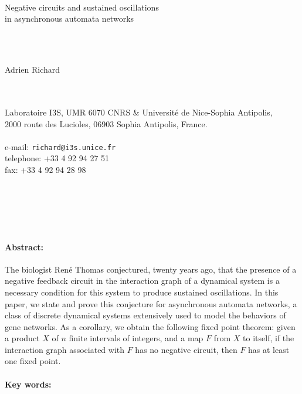 \documentclass[11pt]{article}
\begin{document}
~\\~\\~\\
\begin{center}
\begin{LARGE}
Negative circuits and sustained oscillations\\ in asynchronous
automata networks
\end{LARGE}
~\\~\\
\begin{large}
Adrien Richard
\end{large}
~\\~\\
Laboratoire I3S, UMR 6070 CNRS \& Universit\'e de
Nice-Sophia Antipolis,\\[-4mm] 2000 route des Lucioles, 06903 Sophia
Antipolis, France.
~\\~\\
e-mail: \texttt{richard@i3s.unice.fr}\\[-4mm]
telephone: +33 4 92 94 27 51\\[-4mm]
fax: +33 4 92 94 28 98 
~\\~\\
\end{center}

\newpage

~\\~\\~\\

\paragraph{Abstract:}

The biologist Ren\'e Thomas conjectured, twenty years ago, that the
presence of a negative feedback circuit in the interaction graph of a
dynamical system is a necessary condition for this system to produce
sustained oscillations. In this paper, we state and prove this
conjecture for asynchronous automata networks, a class of discrete
dynamical systems extensively used to model the behaviors of gene
networks. As a corollary, we obtain the following fixed point theorem:
given a product $X$ of $n$ finite intervals of integers, and a map $F$
from $X$ to itself, if the interaction graph associated with $F$ has
no negative circuit, then $F$ has at least one fixed point.

\paragraph{Key words:}
\end{document}
